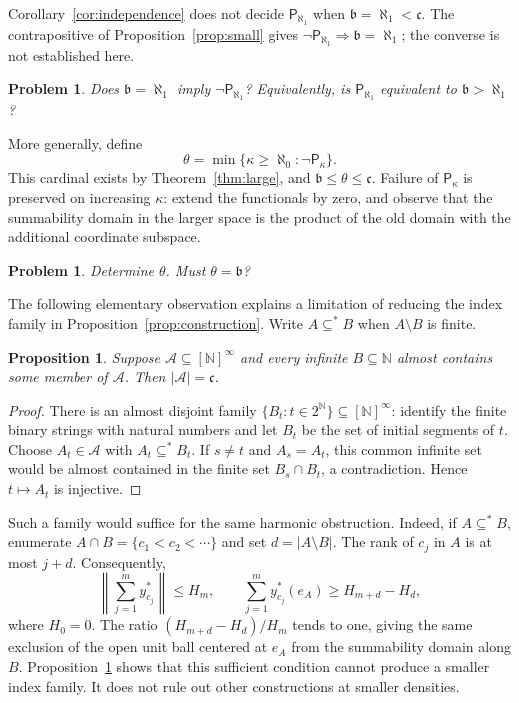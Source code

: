\documentclass[11pt,a4paper]{amsart}
\newtheorem{proposition}[theorem]{Proposition}
\newtheorem{problem}[theorem]{Problem}
\theoremstyle{remark}
\newcommand{\N}{\mathbb N}
\newcommand{\cfrak}{\mathfrak c}
\begin{document}
Corollary~\ref{cor:independence} does not decide
$\mathsf P_{\aleph_1}$ when $\mathfrak b=\aleph_1<\cfrak$.
The contrapositive of Proposition~\ref{prop:small} gives
$\neg\mathsf P_{\aleph_1}\Rightarrow\mathfrak b=\aleph_1$;
the converse is not established here.

\begin{problem}\label{prob:omegaone}
Does $\mathfrak b=\aleph_1$ imply $\neg\mathsf P_{\aleph_1}$?
Equivalently, is $\mathsf P_{\aleph_1}$ equivalent to
$\mathfrak b>\aleph_1$?
\end{problem}

More generally, define
\[
 \theta=\min\{\kappa\geqslant\aleph_0:\neg\mathsf P_\kappa\}.
\]
This cardinal exists by Theorem~\ref{thm:large}, and
$\mathfrak b\leqslant\theta\leqslant\cfrak$.
Failure of $\mathsf P_\kappa$ is preserved on increasing $\kappa$:
extend the functionals by zero, and observe that the summability domain
in the larger space is the product of the old domain with the
additional coordinate subspace.

\begin{problem}\label{prob:threshold}
Determine $\theta$. Must $\theta=\mathfrak b$?
\end{problem}

The following elementary observation explains a limitation of reducing
the index family in Proposition~\ref{prop:construction}. Write
$A\subseteq^*B$ when $A\setminus B$ is finite.

\begin{proposition}\label{prop:coinitial}
Suppose $\mathcal A\subseteq[\N]^\infty$ and every infinite
$B\subseteq\N$ almost contains some member of $\mathcal A$.
Then $|\mathcal A|=\cfrak$.
\end{proposition}

\begin{proof}
There is an almost disjoint family
$\{B_t:t\in2^{\N}\}\subseteq[\N]^\infty$: identify the finite
binary strings with natural numbers and let $B_t$ be the set of
initial segments of $t$. Choose $A_t\in\mathcal A$ with
$A_t\subseteq^*B_t$. If $s\neq t$ and $A_s=A_t$, this common
infinite set would be almost contained in the finite set
$B_s\cap B_t$, a contradiction. Hence $t\mapsto A_t$ is injective.
\end{proof}

Such a family would suffice for the same harmonic obstruction. Indeed,
if $A\subseteq^*B$, enumerate $A\cap B=\{c_1<c_2<\cdots\}$ and set
$d=|A\setminus B|$. The rank of $c_j$ in $A$ is at most $j+d$.
Consequently,
\[
 \left\|\sum_{j=1}^m y_{c_j}^*\right\|\leqslant H_m,
 \qquad
 \sum_{j=1}^m y_{c_j}^*(e_A)\geqslant H_{m+d}-H_d,
\]
where $H_0=0$. The ratio $(H_{m+d}-H_d)/H_m$ tends to one, giving
the same exclusion of the open unit ball centered at $e_A$ from the
summability domain along $B$. Proposition~\ref{prop:coinitial} shows
that this sufficient condition cannot produce a smaller index family.
It does not rule out other constructions at smaller densities.
\end{document}
